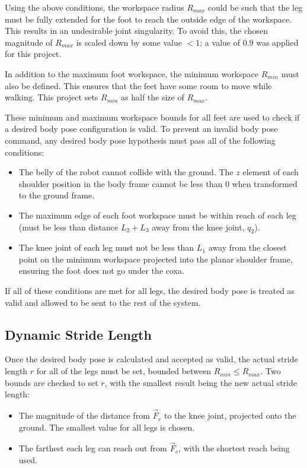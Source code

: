 Using the above conditions, the workspace radius $R_{max}$ could be such that the leg must be fully extended for the foot to reach the outside edge of the workspace. This results in an undesirable joint singularity. To avoid this, the chosen magnitude of $R_{max}$ is scaled down by some value $<1$; a value of $0.9$ was applied for this project.

In addition to the maximum foot workspace, the minimum workspace $R_{min}$ must also be defined. This ensures that the feet have some room to move while walking. This project sets $R_{min}$ as half the size of $R_{max}$. 

These minimum and maximum workspace bounds for all feet are used to check if a desired body pose configuration is valid. To prevent an invalid body pose command, any desired body pose hypothesis must pass all of the following conditions:

\begin{itemize}
    \item The belly of the robot cannot collide with the ground. The $z$ element of each shoulder position in the body frame cannot be less than 0 when transformed to the ground frame. 
    \item The maximum edge of each foot workspace must be within reach of each leg (must be less than distance $L_2 + L_3$ away from the knee joint, $q_2$).
    \item The knee joint of each leg must not be less than $L_1$ away from the closest point on the minimum workspace projected into the planar shoulder frame, ensuring the foot does not go under the coxa.
\end{itemize}

If all of these conditions are met for all legs, the desired body pose is treated as valid and allowed to be sent to the rest of the system. 

\subsection{ Dynamic Stride Length }

Once the desired body pose is calculated and accepted as valid, the actual stride length $r$ for all of the legs must be set, bounded between $R_{min} \le R_{max}$. Two bounds are checked to set $r$, with the smallest result being the new actual stride length:

\begin{itemize}
    \item The magnitude of the distance from $\vec{F}_c$ to the knee joint, projected onto the ground. The smallest value for all legs is chosen.

    \item The farthest each leg can reach out from $\vec{F}_c$, with the shortest reach being used. 
\end{itemize}

